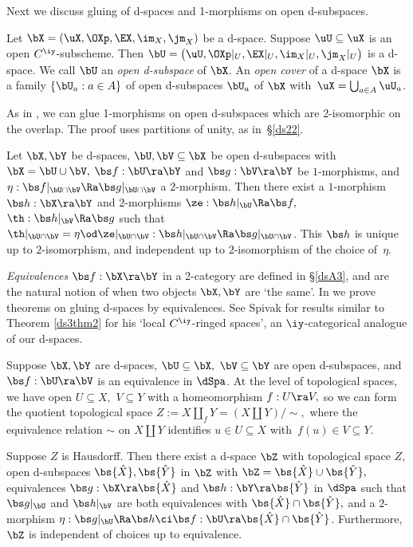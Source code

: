 \documentclass{article}
\begin{document}
Next we discuss gluing of d-spaces and 1-morphisms on open
d-subspaces.

\begin{dfn} Let $\bX=(\uX,\OXp,\EX,\im_X,\jm_X)$ be a d-space.
Suppose $\uU\subseteq\uX$ is an open $C^\iy$-subscheme. Then $\bU=
\bigl(\uU,\OXp\vert_U,\EX\vert_U,\im_X\vert_U,\jm_X\vert_U\bigr)$ is
a d-space. We call $\bU$ an {\it open d-subspace\/} of $\bX$. An
{\it open cover\/} of a d-space $\bX$ is a family $\{\bU_a:a\in A\}$
of open d-subspaces $\bU_a$ of $\bX$ with~$\uX=\bigcup_{a\in
A}\uU_a$.
\label{ds3def2}
\end{dfn}

As in \cite[\S 2.4]{Joyc6}, we can glue 1-morphisms on open
d-subspaces which are 2-isomorphic on the overlap. The proof uses
partitions of unity, as in~\S\ref{ds22}.

\begin{prop} Let\/ $\bX,\bY$ be d-spaces, $\bU,\bV\subseteq\bX$
be open d-subspaces with\/ $\bX=\bU\cup\bV,$ $\bs f:\bU\ra\bY$ and\/
$\bs g:\bV\ra\bY$ be $1$-morphisms, and\/ $\eta:\bs
f\vert_{\bU\cap\bV}\Ra\bs g\vert_{\bU\cap\bV}$ a $2$-morphism. Then
there exist a $1$-morphism $\bs h:\bX\ra\bY$ and\/ $2$-morphisms
$\ze:\bs h\vert_\bU\Ra\bs f,$ $\th:\bs h\vert_\bV\Ra\bs g$ such
that\/ $\th\vert_{\bU\cap\bV}=
\eta\od\ze\vert_{\bU\cap\bV}:\bs h\vert_{\bU\cap\bV}\Ra \bs
g\vert_{\bU\cap\bV}$. This $\bs h$ is unique up to $2$-isomorphism,
and independent up to $2$-isomorphism of the choice of\/~$\eta$.
\label{ds3prop}
\end{prop}

{\it Equivalences\/} $\bs f:\bX\ra\bY$ in a 2-category are defined in
\S\ref{dsA3}, and are the natural notion of when two objects
$\bX,\bY$ are `the same'. In \cite[\S 2.4]{Joyc6} we prove theorems
on gluing d-spaces by equivalences. See Spivak \cite[Lem.~6.8 \&
Prop.~6.9]{Spiv} for results similar to Theorem \ref{ds3thm2} for
his `local $C^\iy$-ringed spaces', an
$\iy$-categorical analogue of our d-spaces.

\begin{thm} Suppose $\bX,\bY$ are d-spaces, $\bU\subseteq\bX,$
$\bV\subseteq\bY$ are open d-subspaces, and\/ $\bs f:\bU\ra\bV$ is
an equivalence in $\dSpa$. At the level of topological spaces, we
have open $U\subseteq X,$ $V\subseteq Y$ with a homeomorphism
$f:U\ra V,$ so we can form the quotient topological space
$Z:=X\amalg_fY=(X\amalg Y)/\sim,$ where the equivalence relation
$\sim$ on $X\amalg Y$ identifies $u\in U\subseteq X$ with\/~$f(u)\in
V\subseteq Y$.

Suppose $Z$ is Hausdorff. Then there exist a d-space $\bZ$ with
topological space $Z,$ open d-subspaces $\bs{\hat X},\bs{\hat Y}$ in
$\bZ$ with\/ $\bZ=\bs{\hat X}\cup\bs{\hat Y},$ equivalences $\bs
g:\bX\ra\bs{\hat X}$ and\/ $\bs h:\bY\ra\bs{\hat Y}$ in $\dSpa$ such
that\/ $\bs g\vert_\bU$ and\/ $\bs h\vert_\bV$ are both equivalences
with\/ $\bs{\hat X}\cap\bs{\hat Y},$ and a $2$-morphism $\eta:\bs
g\vert_\bU\Ra\bs h\ci\bs f:\bU\ra\bs{\hat X}\cap\bs{\hat Y}$.
Furthermore, $\bZ$ is independent of choices up to equivalence.
\label{ds3thm2}
\end{thm}
\end{document}
